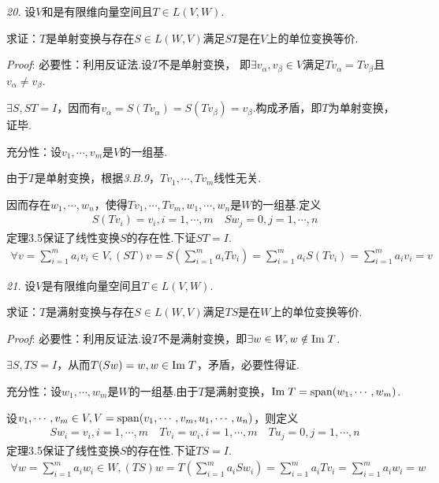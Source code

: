 \hspace*{\fill}

\textit{20.}
设$V$和是有限维向量空间且$T\in L(V,W)$.

求证：$T$是单射变换与存在$S\in L(W,V)$满足$ST$是在$V$上的单位变换等价.

\textit{Proof}:
必要性：利用反证法.设$T$不是单射变换，
即$\exists v_\alpha,v_\beta \in V$满足$Tv_\alpha=Tv_\beta$且$v_\alpha \ne v_\beta$.

$\exists S,ST=I$，因而有$v_\alpha=S(Tv_\alpha)=S(Tv_\beta)=v_\beta$.构成矛盾，即$T$为单射变换，证毕.

充分性：设$v_1,\cdots,v_m$是$V$的一组基.

由于$T$是单射变换，根据\textit{3.B.9}，$Tv_1,\cdots,Tv_m$线性无关.

因而存在$w_1,\cdots,w_n$，使得$Tv_1,\cdots,Tv_m,w_1,\cdots,w_n$是$W$的一组基.定义
    \begin{align*}
        S(Tv_i)=v_i,i=1,\cdots,m \quad Sw_j=0,j=1,\cdots,n
    \end{align*}
定理3.5保证了线性变换$S$的存在性.下证$ST=I$.
    \begin{align*}
        \forall v=\sum_{i=1}^m a_iv_i\in V,(ST)v=S(\sum_{i=1}^m a_iTv_i)
        =\sum_{i=1}^m a_iS(Tv_i)=\sum_{i=1}^m a_iv_i=v
    \end{align*}

\newpage

\textit{21.}
设$V$是有限维向量空间且$T\in L(V,W)$.

求证：$T$是满射变换与存在$S\in L(W,V)$满足$TS$是在$W$上的单位变换等价.

\textit{Proof}:
必要性：利用反证法.设$T$不是满射变换，即$\exists w\in W,w\notin \mathrm{Im \;} T$.

$\exists S,TS=I$，从而$T(Sw)=w,w\in \mathrm{Im \;} T$，矛盾，必要性得证.

充分性：设$w_1,\cdots,w_m$是$W$的一组基.由于$T$是满射变换，$\mathrm{Im \;} T=\mathrm{span} (w_1,\cdots,w_m)$.

设$v_1,\cdots,v_m\in V,V=\mathrm{span} (v_1,\cdots,v_m,u_1,\cdots,u_n)$，则定义
    \begin{align*}
        Sw_i=v_i,i=1,\cdots,m \quad
        Tv_i=w_i,i=1,\cdots,m \quad Tu_j=0,j=1,\cdots,n
    \end{align*}
定理3.5保证了线性变换$S$的存在性.下证$TS=I$.
    \begin{align*}
        \forall w=\sum_{i=1}^m a_iw_i\in W,(TS)w=T(\sum_{i=1}^m a_iSw_i) 
        =\sum_{i=1}^m a_iTv_i=\sum_{i=1}^m a_iw_i=w
    \end{align*}

